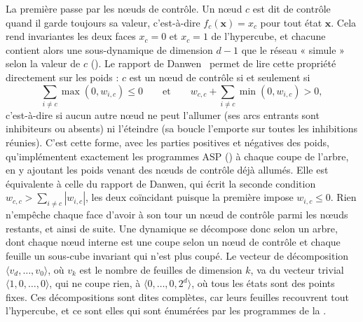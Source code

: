 \documentclass[12pt, a4paper]{article}
\begin{document}
La première passe par les nœuds de contrôle.
Un nœud $c$ est dit de contrôle quand il garde toujours sa valeur, c'est-à-dire $f_c(\mathbf{x}) = x_c$ pour tout état $\mathbf{x}$.
Cela rend invariantes les deux faces $x_c = 0$ et $x_c = 1$ de l'hypercube, et chacune contient alors une sous-dynamique de dimension $d-1$ que le réseau « simule » selon la valeur de $c$ ().
Le rapport de Danwen~\cite{wu2024} permet de lire cette propriété directement sur les poids : $c$ est un nœud de contrôle si et seulement si
\begin{equation}
\sum_{i \neq c} \max(0, w_{i,c}) \le 0
\qquad \text{et} \qquad
w_{c,c} + \sum_{i \neq c} \min(0, w_{i,c}) > 0 ,
\end{equation}
c'est-à-dire si aucun autre nœud ne peut l'allumer (ses arcs entrants sont inhibiteurs ou absents) ni l'éteindre (sa boucle l'emporte sur toutes les inhibitions réunies).
C'est cette forme, avec les parties positives et négatives des poids, qu'implémentent exactement les programmes ASP () à chaque coupe de l'arbre, en y ajoutant les poids venant des nœuds de contrôle déjà allumés.
Elle est équivalente à celle du rapport de Danwen, qui écrit la seconde condition $w_{c,c} > \sum_{i \neq c} |w_{i,c}|$, les deux coïncidant puisque la première impose $w_{i,c} \le 0$.
Rien n'empêche chaque face d'avoir à son tour un nœud de contrôle parmi les nœuds restants, et ainsi de suite.
Une dynamique se décompose donc selon un arbre, dont chaque nœud interne est une coupe selon un nœud de contrôle et chaque feuille un sous-cube invariant qui n'est plus coupé.
Le vecteur de décomposition $\langle v_d, \dots, v_0 \rangle$, où $v_k$ est le nombre de feuilles de dimension $k$, va du vecteur trivial $\langle 1, 0, \dots, 0 \rangle$, qui ne coupe rien, à $\langle 0, \dots, 0, 2^d \rangle$, où tous les états sont des points fixes.
Ces décompositions sont dites complètes, car leurs feuilles recouvrent tout l'hypercube, et ce sont elles qui sont énumérées par les programmes de la .
\end{document}
